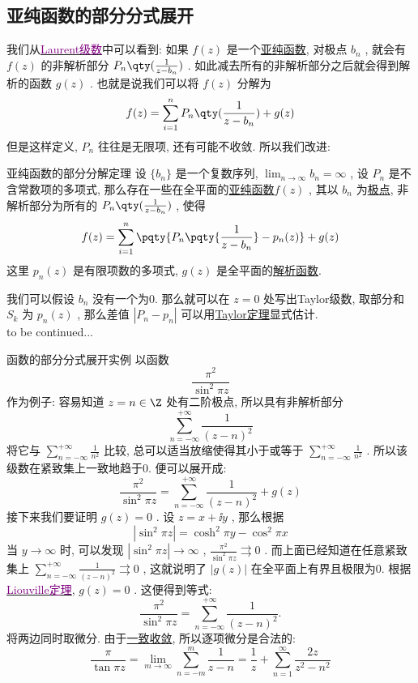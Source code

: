 \documentclass[UTF8]{ctexart}
\newcommand{\hyperrefc}[2]{\hyperref[#1]{\textcolor{purple}{#2}}}
\newcommand{\continued}{{\Large to be continued...}}
\newcommand{\AnalyticalFunction}{\hyperref[dfn:AnalyticalFunction]{解析函数}}
\newcommand{\UniformConvergence}{\hyperref[dfn:UniformConvergence]{一致收敛}}
\newcommand{\MeromorphicFunction}{\hyperref[dfn:MeromorphicFunction]{亚纯函数}}
\newcommand{\TaylorThm}{\hyperref[thm:Taylor]{Taylor定理}}
\begin{document}
\subsection{亚纯函数的部分分式展开}
我们从\hyperrefc{thm:Laurent}{Laurent级数}中可以看到: 如果 \( f(z) \) 是一个\MeromorphicFunction , 对极点 \( b_n \) , 就会有 \( f(z) \) 的非解析部分 \( P_n\qty(\frac{1}{z-b_n}) \) . 如此减去所有的非解析部分之后就会得到解析的函数 \( g(z) \) . 也就是说我们可以将 \( f(z) \) 分解为
\[f(z)=\sum_{i=1}^{n}P_n\qty(\frac{1}{z-b_n})+g(z)\]
但是这样定义,  \( P_n \) 往往是无限项, 还有可能不收敛. 所以我们改进: 
\begin{thm}
    {亚纯函数的部分分解定理}
    设 \( \{b_n\} \) 是一个复数序列,  \( \lim_{n\to\infty }b_n=\infty \) , 设 \( P_n \) 是不含常数项的多项式, 那么存在一些在全平面的\MeromorphicFunction  \( f(z) \) , 其以 \( b_n \) 为\hyperref[dfn:PolarSingularity]{极点}, 非解析部分为所有的 \( P_n\qty(\frac{1}{z-b_n}) \) , 使得
    \[f(z)=\sum_{i=1}^{n}\pqty{P_n\pqty{\frac{1}{z-b_n}}-p_n(z)}+g(z)\]
    这里 \( p_n(z) \) 是有限项数的多项式,  \( g(z) \) 是全平面的\AnalyticalFunction . 
\end{thm}
\begin{prf}
    我们可以假设 \( b_n \) 没有一个为0. 那么就可以在 \( z=0 \) 处写出Taylor级数, 取部分和 \( S_k \) 为 \( p_n(z) \) , 那么差值 \( |P_n-p_n| \) 可以用\TaylorThm 显式估计. \\
    \continued
\end{prf}
\begin{xmp}
    {函数的部分分式展开实例}
    以函数
    \[\frac{\pi^2}{\sin^2\pi z}\]
    作为例子: 容易知道 \( z=n\in\Z \) 处有二阶极点, 所以具有非解析部分
    \[\sum_{n=-\infty}^{+\infty}\frac{1}{(z-n)^2}\]
    将它与 \( \sum\limits_{n=-\infty}^{+\infty}\frac{1}{n^2} \) 比较, 总可以适当放缩使得其小于或等于 \( \sum\limits_{n=-\infty}^{+\infty}\frac{1}{n^2} \) . 所以该级数在紧致集上一致地趋于0. 便可以展开成: 
    \[\frac{\pi^2}{\sin^2\pi z}=\sum_{n=-\infty}^{+\infty}\frac{1}{(z-n)^2}+g(z)\]
    接下来我们要证明 \( g(z)=0 \) . 设 \( z=x+\ii y \) , 那么根据
    \[|\sin^2\pi z|=\cosh^2\pi y-\cos^2\pi x\]
    当 \( y\to\infty \) 时, 可以发现 \( |\sin^2\pi z|\to\infty \) ,  \( \frac{\pi^2}{\sin^2\pi z}\rightrightarrows 0 \) . 而上面已经知道在任意紧致集上 \( \sum_{n=-\infty}^{+\infty}\frac{1}{(z-n)^2}\rightrightarrows 0 \) , 这就说明了 \( |g(z)| \) 在全平面上有界且极限为0. 根据\hyperrefc{thm:Liouville}{Liouville定理},  \( g(z)=0 \) . 这便得到等式: 
    \[\frac{\pi^2}{\sin^2\pi z}=\sum_{n=-\infty}^{+\infty}\frac{1}{(z-n)^2}.\]
    将两边同时取微分. 由于\UniformConvergence , 所以逐项微分是合法的: 
    \[\frac{\pi}{\tan\pi z}=\lim_{m\to\infty}\sum_{n=-m}^{m}\frac{1}{z-n}=\frac{1}{z}+\sum_{n=1}^{\infty}\frac{2z}{z^2-n^2}\]
\end{xmp}
\end{document}
